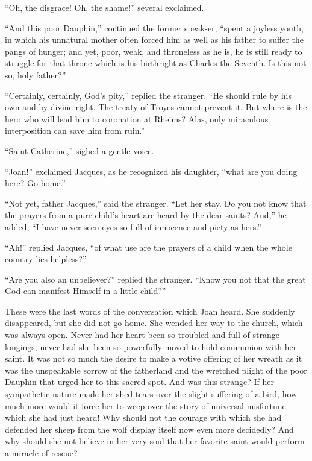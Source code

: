 ``Oh, the disgrace! Oh, the shame!'' several exclaimed.

``And this poor Dauphin,'' continued the former speak-er, ``spent a
joyless youth, in which his unnatural mother often forced him as well as
his father to suffer the pangs of hunger; and yet, poor, weak, and
throneless as he is, he is still ready to struggle for that throne which
is his birthright as Charles the Seventh. Is this not so, holy father?''

``Certainly, certainly, God's pity,'' replied the stranger. ``He should
rule by his own and by divine right. The treaty of Troyes cannot prevent
it. But where is the hero who will lead him to coronation at Rheims?
Alas, only miraculous interposition can save him from ruin.''

``Saint Catherine,'' sighed a gentle voice.

``Joan!'' exclaimed Jacques, as he recognized his daughter, ``what are
you doing here? Go home.''

``Not yet, father Jacques,'' said the stranger. ``Let her stay. Do you
not know that the prayers from a pure child's heart are heard by the
dear saints? And,'' he added, ``I have never seen eyes so full of
innocence and piety as hers.''

``Ah!'' replied Jacques, ``of what use are the prayers of a child when
the whole country lies helpless?''

``Are you also an unbeliever?'' replied the stranger. ``Know you not
that the great God can manifest Himself in a little child?''

These were the last words of the conversation which Joan heard. She
suddenly disappeared, but she did not go home. She wended her way to the
church, which was always open. Never had her heart been so troubled and
full of strange longings, never had she been so powerfully moved to hold
communion with her saint. It was not so much the desire to make a votive
offering of her wreath as it was the unspeakable sorrow of the
fatherland and the wretched plight of the poor Dauphin that urged her to
this sacred spot. And was this strange? If her sympathetic nature made
her shed tears over the slight suffering of a bird, how much more would
it force her to weep over the story of universal misfortune which she
had just heard! Why should not the courage with which she had defended
her sheep from the wolf display itself now even more decidedly? And why
should she not believe in her very soul that her favorite saint would
perform a miracle of rescue?

